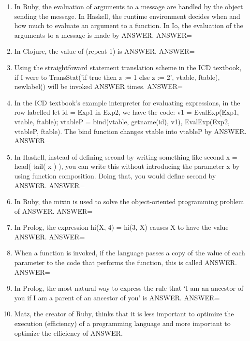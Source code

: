 \documentclass{exam}
\begin{document}
\begin{enumerate}
\item In Ruby, the evaluation of arguments to a message are handled by the object sending the message.  In Haskell, the runtime environment decides when and how much to evaluate an argument to a function.  In Io, the evaluation of the arguments to a message is made by ANSWER.\newline
ANSWER=
\item In Clojure, the value of (repeat 1) is ANSWER.\newline
ANSWER=
\item Using the straightfoward statement translation scheme in the ICD textbook, if I were to TransStat('if true then z := 1 else z := 2', vtable, ftable), newlabel() will be invoked ANSWER times.\newline
ANSWER=
\item In the ICD textbook's example interpreter for evaluating expressions, in the row labelled let id = Exp1 in Exp2, we have the code: v1 = EvalExp(Exp1, vtable, ftable); vtableP = bind(vtable, getname(id), v1), EvalExp(Exp2, vtableP, ftable).  The bind function changes vtable into vtableP by ANSWER.\newline
ANSWER=
\item In Haskell, instead of defining second by writing something like second x = head( tail(  x ) ), you can write this without introducing the parameter x by using function composition.  Doing that, you would define second by ANSWER.\newline
ANSWER=
\item In Ruby, the mixin is used to solve the object-oriented programming problem of ANSWER.\newline
ANSWER=
\item In Prolog, the expression hi(X, 4) = hi(3, X) causes X to have the value ANSWER.\newline
ANSWER=
\item When a function is invoked, if the language passes a copy of the value of each parameter to the code that performs the function, this is called ANSWER.\newline
ANSWER=
\item In Prolog, the most natural way to express the rule that `I am an ancestor of you if I am a parent of an ancestor of you' is ANSWER.\newline
ANSWER=
\item Matz, the creator of Ruby, thinks that it is less important to optimize the execution (efficiency) of a programming language and more important to optimize the efficiency of ANSWER.\newline

\end{enumerate}
\end{document}
